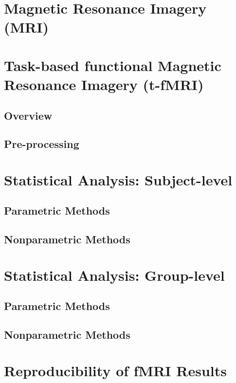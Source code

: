 \section{Magnetic Resonance Imagery (MRI)}

\section{Task-based functional Magnetic Resonance Imagery (t-fMRI)}

\subsection{Overview}

\subsection{Pre-processing}

\section{Statistical Analysis: Subject-level}

\subsection{Parametric Methods}

\subsection{Nonparametric Methods}

\section{Statistical Analysis: Group-level}

\subsection{Parametric Methods}

\subsection{Nonparametric Methods}

\section{Reproducibility of fMRI Results}

